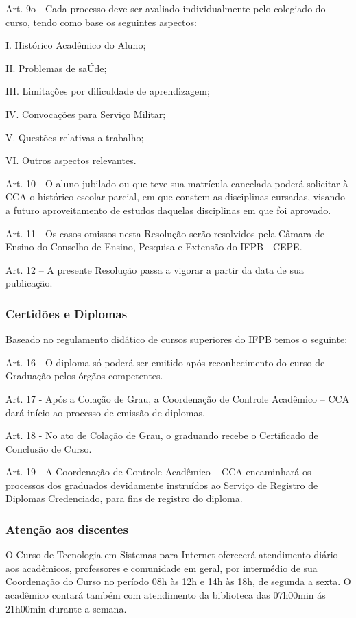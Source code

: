 Art. 9o - Cada processo deve ser avaliado individualmente pelo colegiado do curso, tendo como base os seguintes aspectos:

I. Histórico Acadêmico do Aluno;

II. Problemas de saÚde;

III. Limitações por dificuldade de aprendizagem;

IV. Convocações para Serviço Militar;

V. Questões relativas a trabalho;

VI. Outros aspectos relevantes.

Art. 10 - O aluno jubilado ou que teve sua matrícula cancelada poderá solicitar à CCA o histórico escolar parcial, em que constem as disciplinas cursadas, visando a futuro aproveitamento de estudos daquelas disciplinas em que foi aprovado.

Art. 11 - Os casos omissos nesta Resolução serão resolvidos pela Câmara de Ensino do Conselho de Ensino, Pesquisa e Extensão do IFPB - CEPE.

Art. 12 – A presente Resolução passa a vigorar a partir da data de sua publicação.

\subsubsection{Certidões e Diplomas}

Baseado no regulamento didático de cursos superiores do IFPB temos o seguinte:

Art. 16 - O diploma só poderá ser emitido após reconhecimento do curso de Graduação pelos órgãos competentes.

Art. 17 - Após a Colação de Grau, a Coordenação de Controle Acadêmico – CCA dará início ao processo de emissão de diplomas.

Art. 18 - No ato de Colação de Grau, o graduando recebe o Certificado de Conclusão de Curso.

Art. 19 - A Coordenação de Controle Acadêmico – CCA encaminhará os processos dos graduados devidamente instruídos ao Serviço de Registro de Diplomas Credenciado, para fins de registro do diploma.

\subsubsection{Aten\c{c}\~ao aos discentes}

O Curso de Tecnologia em Sistemas para Internet oferecerá atendimento diário aos acadêmicos, professores e comunidade em geral, por intermédio de sua Coordenação do Curso no período 08h às 12h e 14h às 18h, de segunda a sexta. O acadêmico contará também com atendimento da biblioteca das 07h00min ás 21h00min durante a semana.

